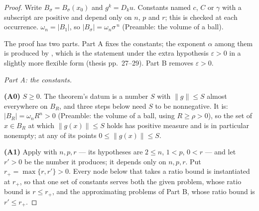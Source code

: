 \begin{proof}
Write $B_\sigma=B_\sigma(x_0)$ and $g^k=D_ku$.  Constants named $c$, $C$ or
$\gamma$ with a subscript are positive and depend only on $n$, $p$ and $r$;
this is checked at each occurrence.  $\omega_n=|B_1|$, so
$|B_\sigma|=\omega_n\sigma^{\,n}$ (Preamble: the volume of a ball).

The proof has two parts.  Part A fixes the constants; the exponent $\alpha$
among them is produced by , which is
the statement under the extra hypothesis $\varepsilon>0$ in a slightly more
flexible form (thesis pp.~27--29).  Part B removes $\varepsilon>0$.

\medskip
\noindent\emph{Part A: the constants.}

\textbf{(A0)} $S\ge0$.  The theorem's datum is a number $S$ with
$\|g\|\le S$ almost everywhere on $B_R$, and three steps below need $S$ to be
nonnegative.  It is: $|B_R|=\omega_nR^n>0$ (Preamble: the volume of a ball,
using $R\ge\rho>0$), so the set of $x\in B_R$ at which $\|g(x)\|\le S$ holds has
positive measure and is in particular nonempty; at any of its points
$0\le\|g(x)\|\le S$.

\textbf{(A1)} Apply  with $n,p,r$ --- its
hypotheses are $2\le n$, $1<p$, $0<r$ --- and let $r'>0$ be the number it
produces; it depends only on $n,p,r$.  Put $r_+=\max\{r,r'\}>0$.  Every node
below that takes a ratio bound is instantiated at $r_+$, so that one set of
constants serves both the given problem, whose ratio bound is $r\le r_+$, and
the approximating problems of Part B, whose ratio bound is $r'\le r_+$.


\end{proof}
